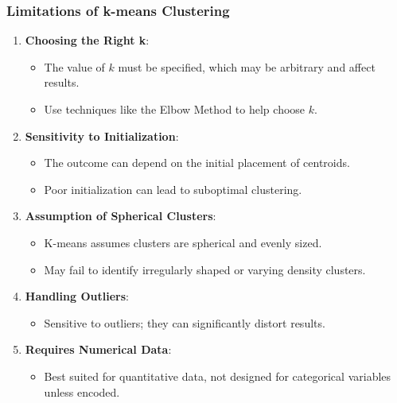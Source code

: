 \documentclass[aspectratio=169]{beamer}
\begin{document}
\begin{frame}[fragile]
  \frametitle{Limitations of k-means Clustering}
  \begin{enumerate}
    \item \textbf{Choosing the Right k}:
      \begin{itemize}
        \item The value of \(k\) must be specified, which may be arbitrary and affect results.
        \item Use techniques like the Elbow Method to help choose \(k\).
      \end{itemize}

    \item \textbf{Sensitivity to Initialization}:
      \begin{itemize}
        \item The outcome can depend on the initial placement of centroids.
        \item Poor initialization can lead to suboptimal clustering.
      \end{itemize}

    \item \textbf{Assumption of Spherical Clusters}:
      \begin{itemize}
        \item K-means assumes clusters are spherical and evenly sized.
        \item May fail to identify irregularly shaped or varying density clusters.
      \end{itemize}

    \item \textbf{Handling Outliers}:
      \begin{itemize}
        \item Sensitive to outliers; they can significantly distort results.
      \end{itemize}

    \item \textbf{Requires Numerical Data}:
      \begin{itemize}
        \item Best suited for quantitative data, not designed for categorical variables unless encoded.
      \end{itemize}
  \end{enumerate}
\end{frame}
\end{document}
